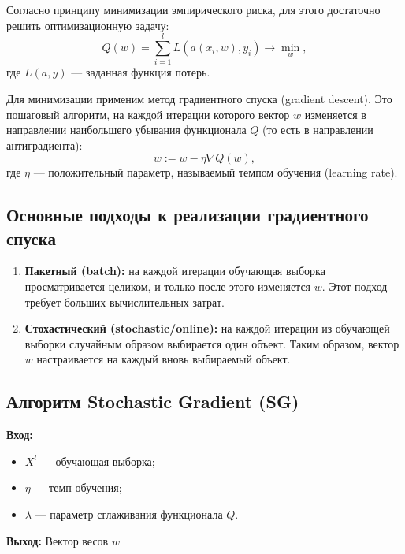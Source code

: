 Согласно принципу минимизации эмпирического риска, для этого достаточно решить оптимизационную задачу:
$$ Q(w) = \sum_{i=1}^l L(a(x_i, w), y_i) \to \min_w, $$
где \( L(a, y) \) — заданная функция потерь.

Для минимизации применим метод градиентного спуска (gradient descent). Это пошаговый алгоритм, на каждой итерации которого вектор \( w \) изменяется в направлении наибольшего убывания функционала \( Q \) (то есть в направлении антиградиента):
$$ w := w - \eta \nabla Q(w), $$
где \( \eta \) — положительный параметр, называемый темпом обучения (learning rate).

\subsection*{Основные подходы к реализации градиентного спуска}
\begin{enumerate}
    \item \textbf{Пакетный (batch):} на каждой итерации обучающая выборка просматривается целиком, и только после этого изменяется \( w \). Этот подход требует больших вычислительных затрат.
    \item \textbf{Стохастический (stochastic/online):} на каждой итерации из обучающей выборки случайным образом выбирается один объект. Таким образом, вектор \( w \) настраивается на каждый вновь выбираемый объект.
\end{enumerate}

\subsection*{Алгоритм Stochastic Gradient (SG)}
\textbf{Вход:}
\begin{itemize}
    \item \( X^l \) --- обучающая выборка;
    \item \( \eta \) --- темп обучения;
    \item \( \lambda \) --- параметр сглаживания функционала \( Q \).
\end{itemize}

\textbf{Выход:} Вектор весов \( w \)

